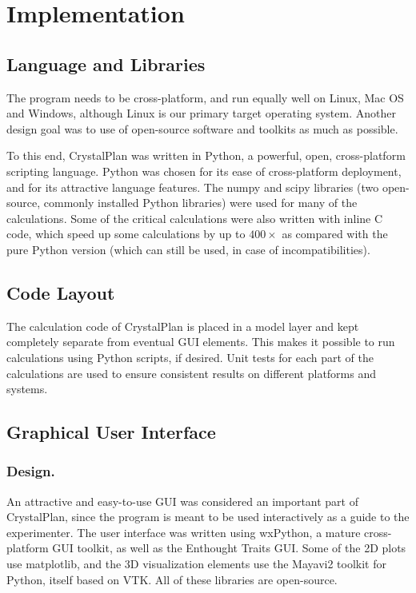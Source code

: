 \documentclass[final]{iucr}              %
\begin{document}
\section{Implementation}




\subsection{Language and Libraries}

The program needs to be cross-platform, and run equally well on Linux, Mac OS
and Windows, although Linux is our primary target operating system. Another
design goal was to use of open-source software and toolkits as much as possible. 

To this end, CrystalPlan was written in Python, a powerful, open, cross-platform
scripting language. Python was chosen for its ease of cross-platform deployment, and for
its attractive language features. The numpy and scipy libraries (two
open-source, commonly installed Python libraries) were used for many of the
calculations. Some of the critical calculations were also written with inline C
code, which speed up some calculations by up to $400\times$ as compared with
the pure Python version (which can still be used, in case of incompatibilities).       

\subsection{Code Layout}

The calculation code of CrystalPlan is placed in a model layer and kept
completely separate from eventual GUI elements. This makes it possible to run
calculations using Python scripts, if desired. Unit tests for each part of the
calculations are used to ensure consistent results on different platforms and
systems.     
 

\subsection{Graphical User Interface}

\subsubsection{Design.}

An attractive and easy-to-use GUI was considered an important part of
CrystalPlan, since the program is meant to be used interactively as a guide to
the experimenter. The user interface was written using wxPython, a mature
cross-platform GUI toolkit, as well as the Enthought Traits GUI. Some of the 2D
plots use matplotlib, and the 3D visualization elements use the Mayavi2 toolkit
for Python, itself based on VTK. All of these libraries are open-source.       
\end{document}
